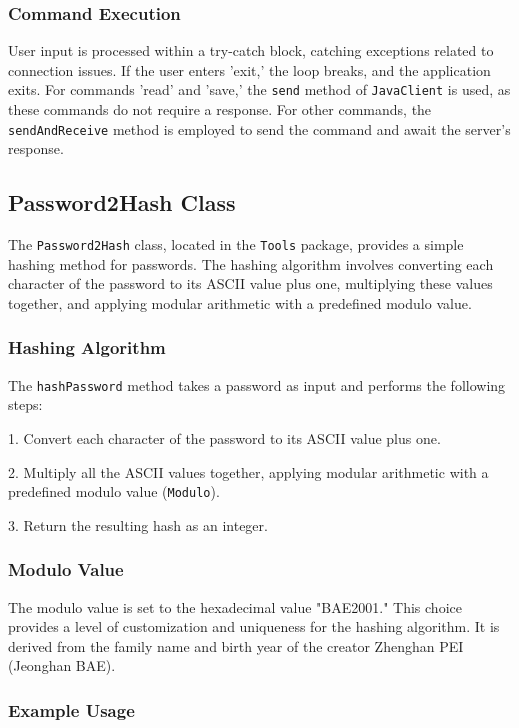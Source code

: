 \documentclass{article}
\begin{document}
\subsubsection*{Command Execution}

User input is processed within a try-catch block, catching exceptions related to connection issues. If the user enters 'exit,' the loop breaks, and the application exits. For commands 'read' and 'save,' the \texttt{send} method of \texttt{JavaClient} is used, as these commands do not require a response. For other commands, the \texttt{sendAndReceive} method is employed to send the command and await the server's response.

\subsection{Password2Hash Class}\label{pw2hash}

The \texttt{Password2Hash} class, located in the \texttt{Tools} package, provides a simple hashing method for passwords. The hashing algorithm involves converting each character of the password to its ASCII value plus one, multiplying these values together, and applying modular arithmetic with a predefined modulo value.

\subsubsection{Hashing Algorithm}

The \texttt{hashPassword} method takes a password as input and performs the following steps:

1. Convert each character of the password to its ASCII value plus one.

2. Multiply all the ASCII values together, applying modular arithmetic with a predefined modulo value (\texttt{Modulo}).

3. Return the resulting hash as an integer.

\subsubsection{Modulo Value}

The modulo value is set to the hexadecimal value "BAE2001." This choice provides a level of customization and uniqueness for the hashing algorithm. It is derived from the family name and birth year of the creator Zhenghan PEI (Jeonghan BAE).

\subsubsection{Example Usage}
\end{document}
